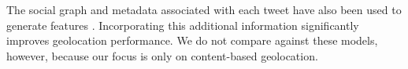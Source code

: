 \documentclass[sigconf,10pt]{acmart}
\newcommand{\fixme}[1]{\textcolor{red}{\textbf{FIXME:} {#1}}}
\begin{document}
\begin{description}
%

The social graph and metadata associated with each tweet have also been used to generate features \citep{hecht2011tweets,schulz2013multi,han2014text}.
Incorporating this additional information significantly improves geolocation performance.
We do not compare against these models, however, 
because our focus is only on content-based geolocation.



\end{description}
\end{document}
